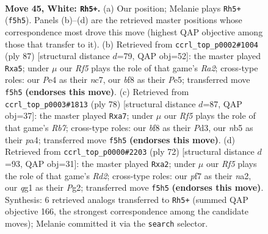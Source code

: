 \documentclass[11pt]{article}
\begin{document}
\clearpage

\begin{figure}[p]\centering
\begin{subfigure}{0.46\textwidth}\centering
\resizebox{\linewidth}{!}{%
\newchessgame
\chessboard[
  setfen={1r3b1k/1r3p2/2Q5/1n2pR2/R3P3/3K4/3N2N1/6q1 w - - 0 45},
  showmover=false,
  pgfstyle=straightmove, color=movearrow, markmove={f5-h5}
]}
\caption{}
\end{subfigure}\hfill
\begin{subfigure}{0.46\textwidth}\centering
\resizebox{\linewidth}{!}{%
\newchessgame
\chessboard[
  setfen={1r6/rPN5/1R6/P3p1k1/4pp2/1R1n4/5P2/6K1 b - - 0 44},
  showmover=false,
  pgfstyle=straightmove, color=movearrow, markmove={a7-a5}
]}
\caption{}
\end{subfigure}
\\[4pt]
\begin{subfigure}{0.46\textwidth}\centering
\resizebox{\linewidth}{!}{%
\newchessgame
\chessboard[
  setfen={2r5/pRp3k1/2pn1r2/8/p4N1R/3P4/2K5/8 w - - 2 40},
  showmover=false,
  pgfstyle=straightmove, color=movearrow, markmove={b7-a7}
]}
\caption{}
\end{subfigure}\hfill
\begin{subfigure}{0.46\textwidth}\centering
\resizebox{\linewidth}{!}{%
\newchessgame
\chessboard[
  setfen={3r1k2/5ppp/3r4/p1R5/8/1P1pN3/n2R1PPP/5K2 w - - 0 37},
  showmover=false,
  pgfstyle=straightmove, color=movearrow, markmove={d2-a2}
]}
\caption{}
\end{subfigure}
\caption{\textbf{Move 45, White: \texttt{Rh5+}.} (a) Our position; Melanie plays \texttt{Rh5+} (\texttt{f5h5}). Panels (b)--(d) are the retrieved master positions whose correspondence most drove this move (highest QAP objective among those that transfer to it). (b) Retrieved from \texttt{ccrl\_top\_p0002\#1004} (ply 87) [structural distance $d$=79, QAP obj=52]: the master played \texttt{Rxa5}; under $\mu$ our \emph{Rf5} plays the role of that game's \emph{Ra2}; cross-type roles: our \emph{P}e4 as their \emph{n}c7, our \emph{b}f8 as their \emph{P}e5; transferred move \texttt{f5h5} \textbf{(endorses this move)}. (c) Retrieved from \texttt{ccrl\_top\_p0003\#1813} (ply 78) [structural distance $d$=87, QAP obj=37]: the master played \texttt{Rxa7}; under $\mu$ our \emph{Rf5} plays the role of that game's \emph{Rb7}; cross-type roles: our \emph{b}f8 as their \emph{P}d3, our \emph{n}b5 as their \emph{p}a4; transferred move \texttt{f5h5} \textbf{(endorses this move)}. (d) Retrieved from \texttt{ccrl\_top\_p0000\#2203} (ply 72) [structural distance $d$=93, QAP obj=31]: the master played \texttt{Rxa2}; under $\mu$ our \emph{Rf5} plays the role of that game's \emph{Rd2}; cross-type roles: our \emph{p}f7 as their \emph{n}a2, our \emph{q}g1 as their \emph{P}g2; transferred move \texttt{f5h5} \textbf{(endorses this move)}. Synthesis: 6 retrieved analogs transferred to \texttt{Rh5+} (summed QAP objective 166, the strongest correspondence among the candidate moves); Melanie committed it via the \texttt{search} selector.}
\label{fig:thought-m88}
\end{figure}
\end{document}
